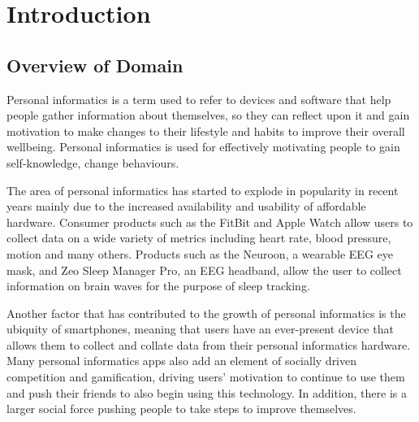 \section{Introduction}

\subsection{Overview of Domain}


Personal informatics is a term used to refer to devices and software that help people gather
information about themselves, so they can reflect upon it and gain motivation to make changes to
their lifestyle and habits to improve their overall wellbeing. Personal informatics is used for
effectively motivating people to gain self-knowledge, change behaviours. %

The area of personal informatics has started to explode in popularity in recent years mainly due to
the increased availability and usability of affordable hardware. Consumer products such as the
FitBit and Apple Watch allow users to collect data on a wide variety of metrics including heart
rate, blood pressure, motion and many others. Products such as the Neuroon, a wearable EEG eye mask,
and Zeo Sleep Manager Pro, an EEG headband, allow the user to collect information on brain waves for
the purpose of sleep tracking.


Another factor that has contributed to the growth of personal informatics is the ubiquity of
smartphones, meaning that users have an ever-present device that allows them to collect and collate
data from their personal informatics hardware. Many personal informatics apps also add an element of
socially driven competition and gamification, driving users' motivation to continue to use them and
push their friends to also begin using this technology. In addition, there is a larger social force
pushing people to take steps to improve themselves. %


